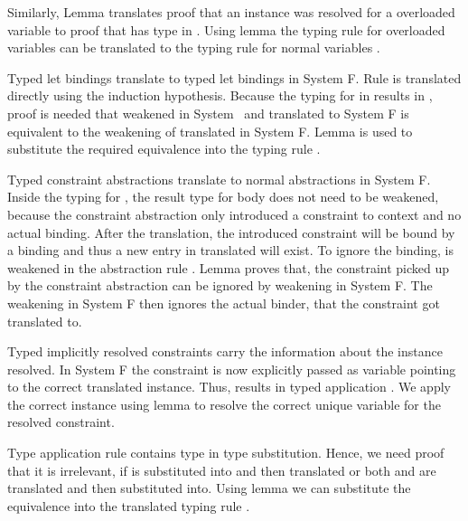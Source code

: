\noindent Similarly, Lemma  translates proof that an instance  \Constr{:}  was resolved for a overloaded variable  to proof that  has type   in .  
Using lemma  the typing rule for overloaded variables  can be translated to the typing rule for normal variables .

\noindent Typed let bindings    translate to typed let bindings in System F. 
Rule  is translated directly using the induction hypothesis. 
Because the typing for  in  results in  , proof is needed that  weakened in System \Fo\ and translated to System F is equivalent to the weakening of translated  in System F. 
Lemma  is used to substitute the required equivalence into the typing rule  .

\noindent Typed constraint abstractions  translate to normal abstractions in System F.
Inside the typing for , the result type  for body  does not need to be weakened, because the constraint abstraction only introduced a constraint to context  and no actual binding. 
After the translation, the introduced constraint will be bound by a binding and thus a new entry in translated  will exist. To ignore the binding,  is weakened in the abstraction rule .
Lemma  proves that, the constraint picked up by the constraint abstraction can be ignored by weakening  in System F. The weakening in System F then ignores the actual binder, that the constraint got translated to.

\noindent Typed implicitly resolved constraints  carry the information about the instance resolved. In System F the constraint is now explicitly passed as variable pointing to the correct translated instance. Thus,  results in typed application . We apply the correct instance using lemma  to resolve the correct unique variable for the resolved constraint.

\noindent Type application rule  contains type in type substitution. Hence, we need proof that it is irrelevant, if  is substituted into  and then translated or both  and  are translated and then substituted into. 
Using lemma  we can substitute the equivalence into the translated typing rule  .

